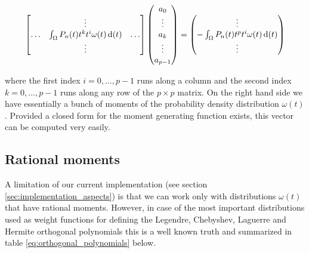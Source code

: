 \documentclass[a4paper,10pt]{article}
\begin{document}
\begin{equation}
  \label{eq:linsys_for_extension}
  \begin{bmatrix}
    {}     & \vdots                                        & {} \\
    \hdots & \int_\Omega P_n(t) t^k t^i \omega(t) \,\mathrm{d}(t) & \hdots \\
    {}     & \vdots                                        & {} \\
  \end{bmatrix}
  \begin{pmatrix}
    a_0 \\
    \vdots \\
    a_k \\
    \vdots \\
    a_{p-1}
  \end{pmatrix}
  =
  \begin{pmatrix}
  \vdots \\
  - \int_\Omega P_n(t) t^p t^i \omega(t) \,\mathrm{d}(t) \\
  \vdots \\
  \end{pmatrix}
\end{equation}

where the first index $i = 0, \ldots, p-1$ runs along a column
and the second index $k = 0, \ldots, p-1$ runs along any row
of the $p \times p$ matrix. On the right hand side we have essentially
a bunch of moments of the probability density distribution $\omega(t)$.
Provided a closed form for the moment generating function exists,
this vector can be computed very easily.


\subsection{Rational moments}

A limitation of our current implementation (see section \ref{sec:implementation_aspects})
is that we can work only with distributions $\omega(t)$ that have rational moments.
However, in case of the most important distributions used as weight functions for
defining the Legendre, Chebyshev, Laguerre and Hermite orthogonal polynomials this
is a well known truth and summarized in table \ref{eq:orthogonal_polynomials} below.
\end{document}
